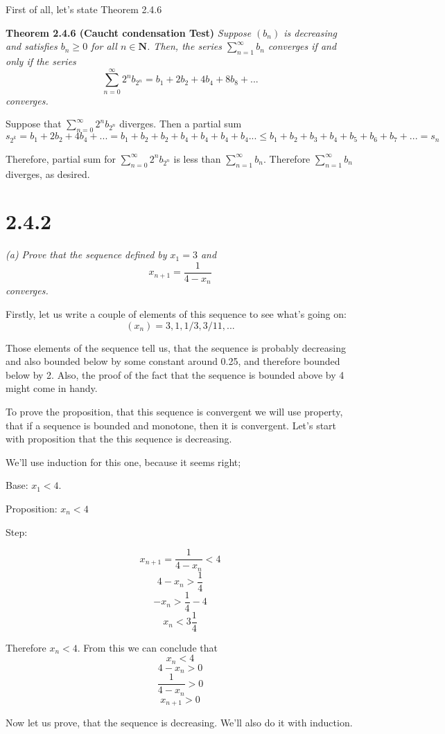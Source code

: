 \documentclass[11pt,oneside,titlepage]{book}
\begin{document}
First of all, let's state Theorem 2.4.6

\textbf{Theorem 2.4.6 (Caucht condensation Test)}
\textit{Suppose $(b_n)$ is decreasing and satisfies $b_n \geq 0$ for all
  $n \in \textbf{N}$. Then, the series $\sum_{n = 1}^{\infty}b_n$ converges
  if and only if the series }
$$\sum_{n = 0}^{\infty}2^n b_{2^n} = b_1 + 2 b_2 + 4 b_4 + 8 b_8 + ...$$
\textit{converges.}

Suppose that $\sum^{\infty}_{n = 0} 2^n b_{2^n}$ diverges. Then a partial
sum
$$s_{2^k} = b_1 + 2 b_2 + 4 b_4 + ... =
b_1 + b_2 + b_2 + b_4 + b_4 + b_4 + b_4 ... \leq
b_1 + b_2 + b_3 + b_4 + b_5 + b_6 + b_7 + ... = s_n $$

Therefore, partial sum for $\sum^{\infty}_{n = 0} 2^n b_{2^n}$ is less than
$\sum^{\infty}_{n = 1} b_n$. Therefore $\sum^{\infty}_{n = 1} b_n$ diverges,
as desired.

\section*{2.4.2}
\textit{(a) Prove that the sequence defined by $x_1 = 3$ and}
$$x_{n + 1} = \frac{1}{4 - x_n}$$
\textit{converges.}



Firstly, let us write a couple of elements of this sequence to see what's going on:
$$(x_n) = 3, 1, 1/3, 3/11, ...$$

Those elements of the sequence tell us, that the sequence is probably decreasing
and also bounded below by some constant around 0.25, and therefore bounded below
by 2. Also, the proof of the fact that the sequence is bounded above by 4 might
come in handy.

To prove the proposition, that this sequence  is convergent we will
use property, that if a sequence is bounded and monotone, then it is convergent.
Let's start with proposition that the this sequence is decreasing.

We'll use induction for this one, because it seems right;

Base: $x_1 < 4$.

Proposition: $x_n < 4$

Step:

$$x_{n + 1} = \frac{1}{4 - x_n} < 4$$
$$4 - x_n > \frac{1}{4}$$
$$- x_n > \frac{1}{4} - 4$$
$$x_n < 3\frac{1}{4}$$

Therefore $x_n < 4$. From this we can conclude that 
$$x_n < 4$$
$$4 - x_n > 0$$
$$\frac{1}{4 - x_n} > 0$$
$$x_{n + 1} > 0$$

Now let us prove, that the sequence is decreasing. We'll also do it with induction.
\end{document}
